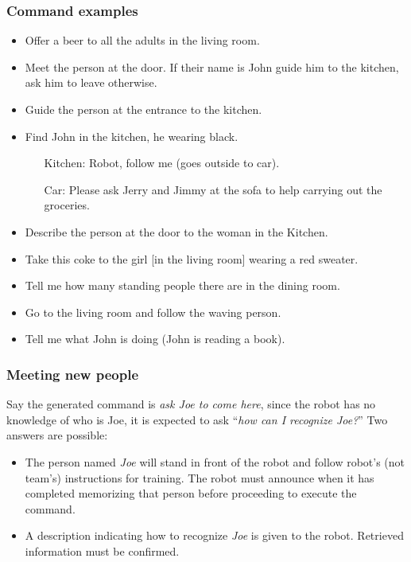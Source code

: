 \subsubsection{Command examples}
\begin{itemize}
	\item Offer a beer to all the adults in the living room.
	\item Meet the person at the door. If their name is John guide him to the kitchen, ask him to leave otherwise.
	\item Guide the person at the entrance to the kitchen.
	\item Find John in the kitchen, he wearing black.
	\begin{itemize}
		\item[Kitchen:] Robot, follow me (goes outside to car).
		\item[Car:] Please ask Jerry and Jimmy at the sofa to help carrying out the groceries.
	\end{itemize}
	\item Describe the person at the door to the woman in the Kitchen.
	\item Take this coke to the girl [in the living room] wearing a red sweater.
	\item Tell me how many standing people there are in the dining room.
	\item Go to the living room and follow the waving person.
	\item Tell me what John is doing (John is reading a book).
\end{itemize}

\subsubsection{Meeting new people}
Say the generated command is \textit{ask Joe to come here}, since the robot has no knowledge of who is Joe, it is expected to ask \enquote{\textit{how can I recognize Joe?}} Two answers are possible:
\begin{itemize}
	\item {} The person named \textit{Joe} will stand in front of the robot and follow robot's (not team's) instructions for training. The robot must announce when it has completed memorizing that person before proceeding to execute the command.
	\item {} A description indicating how to recognize \textit{Joe} is given to the robot. Retrieved information must be confirmed.
\end{itemize}


